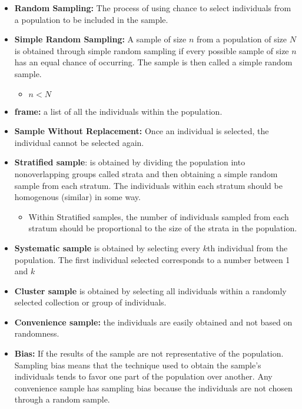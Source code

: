 \documentclass{report}
\begin{document}
\begin{itemize}
            \item \textbf{Random Sampling:} The process of using chance to select individuals from a population to be included in the sample.
            \item \textbf{Simple Random Sampling:} A sample of size $n$  from a population of size $N $  is obtained through simple random sampling if every possible sample of size $n$  has an equal chance of occurring. The sample is then called a simple random sample.
                \begin{itemize}
                    \item $n < N $
                \end{itemize}
            \item \textbf{frame:} a list of all the individuals within the population.
            \item \textbf{Sample Without Replacement:} Once an individual is selected, the individual cannot be selected again.
            \item \textbf{Stratified sample}: is obtained by dividing the population into nonoverlapping groups called strata and then obtaining a simple random sample from each stratum. The individuals within each stratum should be homogenous (similar) in some way.
                \begin{itemize}
                    \item Within Stratified samples, the number of individuals sampled from each stratum should be proportional to the size of the strata in the population.
                \end{itemize}
            \item \textbf{Systematic sample} is obtained by selecting every $k$th individual from the population. The first individual selected corresponds to a number between 1 and $k$
            \item \textbf{Cluster sample} is obtained by selecting all individuals within a randomly selected collection or group of individuals.
            \item \textbf{Convenience sample:} the individuals are easily obtained and not based on randomness.
            \item \textbf{Bias:} If the results of the sample are not representative of the population. Sampling bias means that the technique used to obtain the sample's individuals tends to favor one part of the  population over another. Any convenience sample has sampling bias because the individuals are not chosen through a random sample.

\end{itemize}
\end{document}
